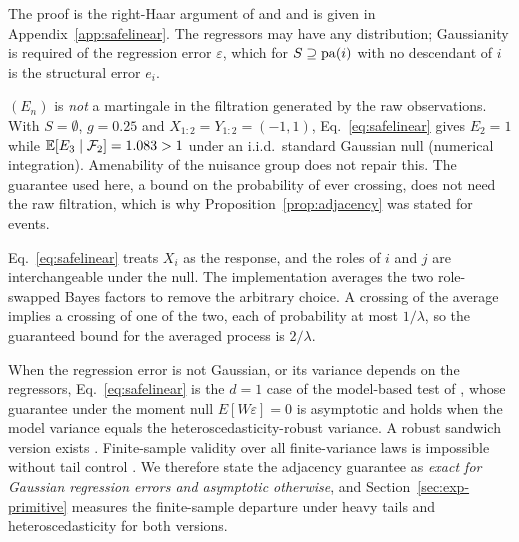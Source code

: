 \noindent The proof is the right-Haar argument of
\citet{hendriksen2021optional} and \citet{grunwald2024safe} and is given in
Appendix~\ref{app:safelinear}. The regressors may have any distribution;
Gaussianity is required of the regression error $\varepsilon$, which for
$S\supseteq\mathrm{pa}(i)$ with no descendant of $i$ is the structural error $e_i$.

\begin{remark}\label{rem:raw}
$(E_n)$ is \emph{not} a martingale in the filtration generated by the raw
observations. With $S=\emptyset$, $g=0.25$ and
$X_{1:2}=Y_{1:2}=(-1,1)$, Eq.~\eqref{eq:safelinear} gives $E_2=1$ while
$\mathbb{E}[E_3\mid\mathcal{F}_2]=1.083>1$ under an i.i.d.\ standard Gaussian null (numerical
integration). Amenability of the nuisance group does not repair this. The
guarantee used here, a bound on the probability of ever crossing, does not need
the raw filtration, which is why Proposition~\ref{prop:adjacency} was stated for
events.
\end{remark}

\begin{remark}\label{rem:avg}
Eq.~\eqref{eq:safelinear} treats $X_i$ as the response, and the roles of $i$
and $j$ are interchangeable under the null. The implementation averages the two
role-swapped Bayes factors to remove the arbitrary choice. A crossing of the
average implies a crossing of one of the two, each of probability at most
$1/\lambda$, so the guaranteed bound for the averaged process is $2/\lambda$.
\end{remark}

\begin{remark}\label{rem:offmodel}
When the regression error is not Gaussian, or its variance depends on the
regressors, Eq.~\eqref{eq:safelinear} is the $d=1$ case of the model-based
test of \citet{lindon2026anytime}, whose guarantee under the moment null
$E[W\varepsilon]=0$ is asymptotic and holds when the model variance equals the
heteroscedasticity-robust variance. A robust sandwich version exists
\citep[Theorem~5.4 of the arXiv version]{lindon2026anytime}. Finite-sample
validity over all finite-variance laws is impossible without tail control
\citep{shah2020hardness}. We therefore state the adjacency guarantee as
\emph{exact for Gaussian regression errors and asymptotic otherwise}, and
Section~\ref{sec:exp-primitive} measures the finite-sample departure under
heavy tails and heteroscedasticity for both versions.
\end{remark}

